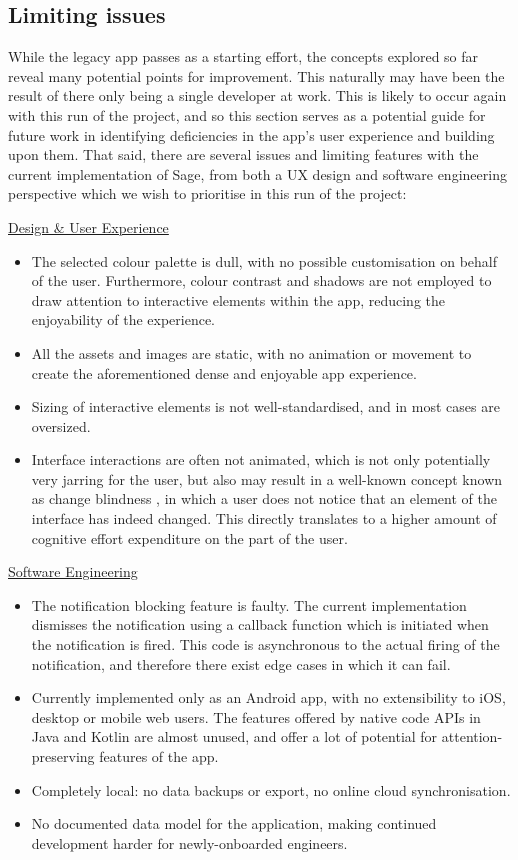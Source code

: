 \subsection{Limiting issues}
While the legacy app passes as a starting effort, the concepts explored so far reveal many potential points for improvement. This naturally may have been the result of there only being a single developer at work. This is likely to occur again with this run of the project, and so this section serves as a potential guide for future work in identifying deficiencies in the app's user experience and building upon them. That said, there are several issues and limiting features with the current implementation of Sage, from both a UX design and software engineering perspective which we wish to prioritise in this run of the project:

\underline{Design \& User Experience}
\begin{itemize}
    \item The selected colour palette is dull, with no possible customisation on behalf of the user. Furthermore, colour contrast and shadows are not employed to draw attention to interactive elements within the app, reducing the enjoyability of the experience.
    \item All the assets and images are static, with no animation or movement to create the aforementioned dense and enjoyable app experience.
    \item Sizing of interactive elements is not well-standardised, and in most cases are oversized.
    \item Interface interactions are often not animated, which is not only potentially very jarring for the user, but also may result in a well-known concept known as change blindness \cite{simons1997change,simons2005change}, in which a user does not notice that an element of the interface has indeed changed. This directly translates to a higher amount of cognitive effort expenditure on the part of the user.
\end{itemize}

\underline{Software Engineering}
\begin{itemize}
    \item The notification blocking feature is faulty. The current implementation dismisses the notification using a callback function which is initiated when the notification is fired. This code is asynchronous to the actual firing of the notification, and therefore there exist edge cases in which it can fail.
    \item Currently implemented only as an Android app, with no extensibility to iOS, desktop or mobile web users. The features offered by native code APIs in Java and Kotlin are almost unused, and offer a lot of potential for attention-preserving features of the app.
    \item Completely local: no data backups or export, no online cloud synchronisation.
    \item No documented data model for the application, making continued development harder for newly-onboarded engineers.
\end{itemize}

